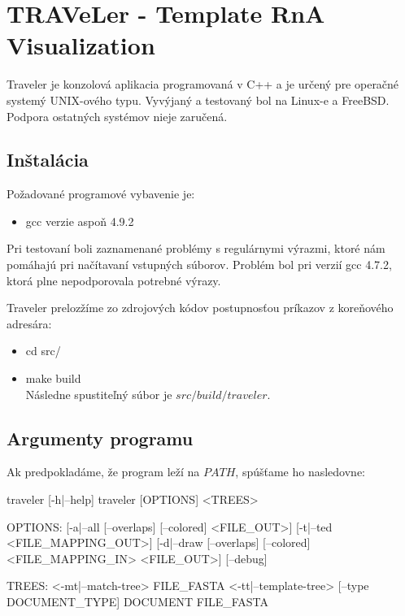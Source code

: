 
\newcommand{\paramI}[1]{\text{-}\ensuremath{#1}}
\newcommand{\param}[1]{\text{\--\--}\ensuremath{#1}}

\chapter{TRAVeLer - Template RnA Visualization}

Traveler je konzolová aplikacia programovaná v C++ a je určený pre operačné systemý UNIX-ového typu.
Vyvýjaný a testovaný bol na Linux-e a FreeBSD. Podpora ostatných systémov nieje zaručená.

\section{Inštalácia}

Požadované programové vybavenie je:
\begin{itemize}
  \item gcc verzie aspoň 4.9.2
\end{itemize}

Pri testovaní boli zaznamenané problémy s regulárnymi výrazmi, ktoré nám pomáhajú pri načítavaní
vstupných súborov. Problém bol pri verzií gcc 4.7.2, ktorá plne nepodporovala potrebné výrazy.

Traveler prelozžíme zo zdrojových kódov postupnosťou príkazov z koreňového adresára:
\begin{itemize}
  \item cd src/
  \item make build
    \\
    Následne spustiteľný súbor je $src/build/traveler$.
\end{itemize}

\section{Argumenty programu}

Ak predpokladáme, že program leží na $PATH$, spúšťame ho nasledovne:

\begin{code}[frame=none]
traveler [-h|--help]
traveler [OPTIONS] <TREES>

OPTIONS:
  [-a|--all [--overlaps] [--colored] <FILE_OUT>]
  [-t|--ted <FILE_MAPPING_OUT>]
  [-d|--draw [--overlaps] [--colored] <FILE_MAPPING_IN> <FILE_OUT>]
  [--debug]

TREES:
  <-mt|--match-tree> FILE_FASTA
  <-tt|--template-tree> [--type DOCUMENT_TYPE] DOCUMENT FILE_FASTA
\end{code}

